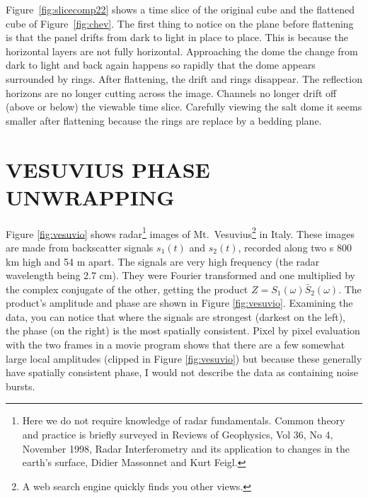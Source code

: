 \par
Figure~\ref{fig:slicecomp22} shows a time slice of the original cube
and the flattened cube of Figure~\ref{fig:chev}.
The first thing to notice on the plane before flattening is that the panel 
drifts from dark to light in place to place.
This is because the horizontal layers are not fully horizontal.
Approaching the dome the change from dark to light and 
back again happens so rapidly that the dome appears surrounded by rings.
After flattening, the drift and rings disappear.
The reflection horizons are no longer cutting across the image.
Channels no longer drift off (above or below) the viewable time slice.
Carefully viewing the salt dome it seems smaller after flattening because the 
rings are replace by a bedding plane.
%

%
%

\section{VESUVIUS PHASE UNWRAPPING}
Figure \ref{fig:vesuvio} shows
radar\footnote{
	Here we do not require knowledge of radar fundamentals.
	Common theory and practice is briefly surveyed in
	Reviews of Geophysics, Vol 36, No 4, November 1998,
	Radar Interferometry and its application to changes
	in the earth's surface, Didier Massonnet and Kurt Feigl.
	}
images of
Mt.~Vesuvius\footnote{
        A web search engine quickly finds you other views.
        }
in Italy.
These images are made from backscatter
signals $s_1(t)$ and $s_2(t)$,
recorded along two s 800 km high and 54 m apart.
The signals are very high frequency
(the radar wavelength being 2.7 cm).
They were Fourier transformed
and one multiplied by the complex conjugate of the other,
getting the product $Z=S_1(\omega) \bar S_2(\omega)$.
The product's amplitude and phase are shown in Figure \ref{fig:vesuvio}.
Examining the data,
you can notice that where the signals are strongest (darkest on the left),
the phase (on the right)
is the most spatially consistent.
Pixel by pixel evaluation with the two frames in a movie program
shows that there are a few somewhat large local amplitudes
(clipped in Figure \ref{fig:vesuvio})
but because these generally have spatially consistent phase,
I would not describe the data as containing noise bursts.

